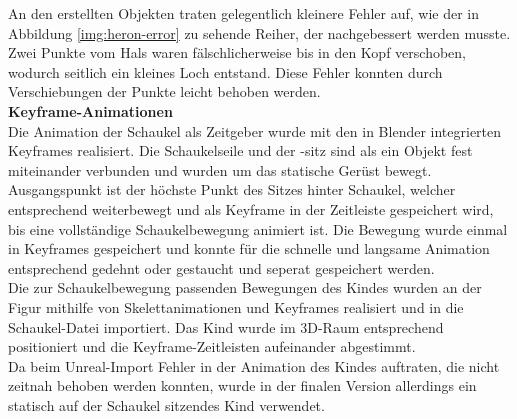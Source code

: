 \documentclass{Bericht}
\begin{document}
An den erstellten Objekten traten gelegentlich kleinere Fehler auf, wie der in Abbildung \ref{img:heron-error} zu sehende Reiher, der nachgebessert werden musste. Zwei Punkte vom Hals waren fälschlicherweise bis in den Kopf verschoben, wodurch seitlich ein kleines Loch entstand. Diese Fehler konnten durch Verschiebungen der Punkte leicht behoben werden.\\
			 
\textbf{Keyframe-Animationen}\\
Die Animation der Schaukel als Zeitgeber wurde mit den in Blender integrierten Keyframes realisiert. Die Schaukelseile und der -sitz sind als ein Objekt fest miteinander verbunden und wurden um das statische Gerüst bewegt. Ausgangspunkt ist der höchste Punkt des Sitzes hinter Schaukel, welcher entsprechend weiterbewegt und als Keyframe in der Zeitleiste gespeichert wird, bis eine vollständige Schaukelbewegung animiert ist. Die Bewegung wurde einmal in Keyframes gespeichert und konnte für die schnelle und langsame Animation entsprechend gedehnt oder gestaucht und seperat gespeichert werden.\\
Die zur Schaukelbewegung passenden Bewegungen des Kindes wurden an der Figur mithilfe von Skelettanimationen und Keyframes realisiert und in die Schaukel-Datei importiert. Das Kind wurde im 3D-Raum entsprechend positioniert und die Keyframe-Zeitleisten aufeinander abgestimmt. \\
Da beim Unreal-Import Fehler in der Animation des Kindes auftraten, die nicht zeitnah behoben werden konnten, wurde in der finalen Version allerdings ein statisch auf der Schaukel sitzendes Kind verwendet. 
		
\end{document}
